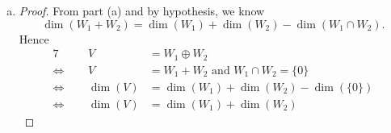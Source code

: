 \begin{Exercise}
\begin{enumerate}[(a)]
\begin{proof}
By hypothesis that $W_1,W_2$ are finite-dimensional vector spaces, we know $W_1\cap W_2$ is also finite-dimensional; hence we obtain $k+m,k+p,k<\infty$. From formula \eqref{eq:ex_1.6.29a3}, we conclude $W_1+W_2$ is also a finite-dimensional vector space since $k+m+p<\infty$.
\end{proof}

\item
\begin{proof}
From part (a) and by hypothesis, we know
$$
\dim(W_1+W_2) = \dim(W_1)+\dim(W_2)-\dim(W_1\cap W_2).
$$
Hence
\begin{alignat*}{7}
\quad&& V &= W_1\oplus W_2 \\
\iff&& V &= W_1+W_2\text{ and }W_1\cap W_2=\{0\} \\
\iff&& \dim(V) &= \dim(W_1)+\dim(W_2)-\dim(\{0\}) \\
\iff&& \dim(V) &= \dim(W_1)+\dim(W_2)
\end{alignat*}
\end{proof}
\end{enumerate}
\end{Exercise}